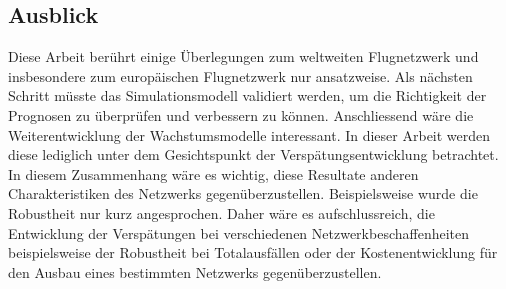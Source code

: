\subsection{Ausblick}
Diese Arbeit berührt einige Überlegungen zum weltweiten Flugnetzwerk und insbesondere zum europäischen Flugnetzwerk nur ansatzweise.
Als nächsten Schritt müsste das Simulationsmodell validiert werden, um die Richtigkeit der Prognosen zu überprüfen und verbessern zu können.
Anschliessend wäre die Weiterentwicklung der Wachstumsmodelle interessant.
In dieser Arbeit werden diese lediglich unter dem Gesichtspunkt der Verspätungsentwicklung betrachtet.
In diesem Zusammenhang wäre es wichtig, diese Resultate anderen Charakteristiken des Netzwerks gegenüberzustellen.
Beispielsweise wurde die Robustheit nur kurz angesprochen.
Daher wäre es aufschlussreich, die Entwicklung der Verspätungen bei verschiedenen Netzwerkbeschaffenheiten beispielsweise der Robustheit bei
Totalausfällen oder der Kostenentwicklung für den Ausbau eines bestimmten Netzwerks gegenüberzustellen.
